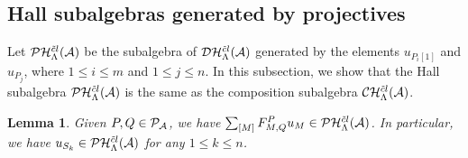 \documentclass[reqno,12pt]{amsart}
\numberwithin{equation}{section}
\theoremstyle{plain} %
\newtheorem{lemma}[theorem]{\bf Lemma}
\theoremstyle{definition} %
\begin{document}
\subsection{Hall subalgebras generated by projectives}
Let $\mathcal {P}\mathcal {H}_\Lambda^{{\tilde{c}l}}({\mathcal{A}})$ be the subalgebra of $\mathcal {D}\mathcal {H}_\Lambda^{{\tilde{c}l}}({\mathcal{A}})$ generated by the elements $u_{P_i[1]}$ and $u_{P_j}$, where $1\leq i\leq m$ and $1\leq j\leq n$. In this subsection, we show that the Hall subalgebra $\mathcal {P}\mathcal {H}_\Lambda^{{\tilde{c}l}}({\mathcal{A}})$ is the same as the composition subalgebra $\mathcal {C}\mathcal {H}_\Lambda^{{\tilde{c}l}}({\mathcal{A}})$.


\begin{lemma}\label{lem:simple-in-projective}
Given $P, Q\in\mathcal {P}_{\mathcal{A}}$, we have $\sum_{[M]}F_{M,Q}^{P}u_M\in \mathcal {P}\mathcal {H}_\Lambda^{{\tilde{c}l}}({\mathcal{A}})$. In particular, we have $u_{S_k}\in \mathcal {P}\mathcal {H}_\Lambda^{{\tilde{c}l}}({\mathcal{A}})$ for any $1\leq k\leq n$.
\end{lemma}
\end{document}
